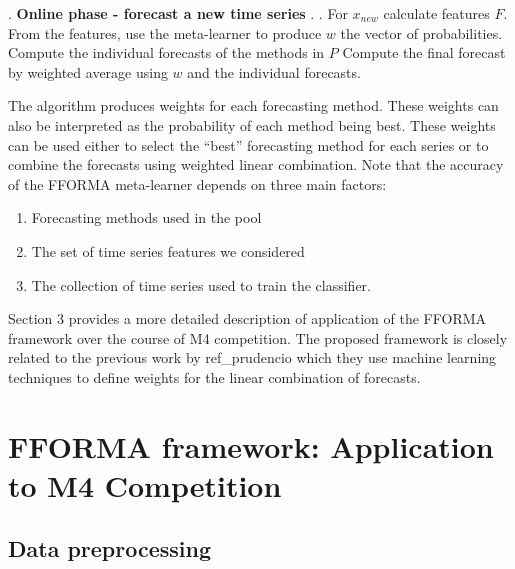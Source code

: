 \documentclass[11pt,a4paper,]{article}
\providecommand{\tightlist}{%
  \setlength{\itemsep}{0pt}\setlength{\parskip}{0pt}}
\theoremstyle{definition}
\theoremstyle{definition}
\theoremstyle{definition}
\theoremstyle{remark}
\begin{document}
\begin{algorithm}[!ht]
\begin{algorithmic}[1]
            .
    \Statex
     \Statex \textbf{Online phase - forecast a new time series}
    \Statex {}
    \Statex \hspace{1cm} .
     \Statex {}
      \Statex \hspace{1cm}.
  \State For $x_{new}$ calculate features $F$.
  \State From the features, use the meta-learner to produce $w$ the vector of probabilities. 
  \State Compute the individual forecasts of the methods in $P$
  \State Compute the final forecast by weighted average using $w$ and the individual forecasts.
   \end{algorithmic}
\end{algorithm}

The algorithm produces weights for each forecasting method. These
weights can also be interpreted as the probability of each method being
best. These weights can be used either to select the ``best''
forecasting method for each series or to combine the forecasts using
weighted linear combination. Note that the accuracy of the FFORMA
meta-learner depends on three main factors:

\begin{enumerate}
\def\labelenumi{\arabic{enumi}.}
\tightlist
\item
  Forecasting methods used in the pool
\item
  The set of time series features we considered
\item
  The collection of time series used to train the classifier.
\end{enumerate}

Section 3 provides a more detailed description of application of the
FFORMA framework over the course of M4 competition. The proposed
framework is closely related to the previous work by ref\_prudencio
which they use machine learning techniques to define weights for the
linear combination of forecasts.

\section{FFORMA framework: Application to M4
Competition}\label{fforma-framework-application-to-m4-competition}

\subsection{Data preprocessing}\label{data-preprocessing}
\end{document}
